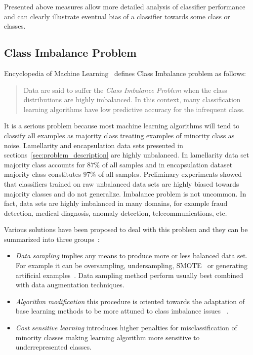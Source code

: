 \documentclass[a4paper, 11pt, table]{article}
\begin{document}
Presented above measures allow more detailed analysis of classifier performance and can clearly illustrate eventual bias of a classifier towards some class or classes. 

\subsection{Class Imbalance Problem}
\label{sec:class_imbalance}
Encyclopedia of Machine Learning~\cite{Ling2010} defines Class Imbalance problem as follows:
\blockquote{Data are said to suffer the \textit{Class Imbalance Problem} when the class distributions are highly imbalanced. In this context, many classification learning algorithms have low predictive accuracy for the infrequent class.}

It is a serious problem because most machine learning algorithms will tend to classify all examples as majority class treating examples of minority class as noise. Lamellarity and encapsulation data sets presented in sections~\ref{sec:problem_description} are highly unbalanced. In lamellarity data set majority class accounts for $87\%$ of all samples and in encapsulation dataset majority class constitutes $97\%$ of all samples. Preliminary experiments showed that classifiers trained on raw unbalanced data sets are highly biased towards majority classes and do not generalize. Imbalance problem is not uncommon. In fact, data sets are highly imbalanced in many domains, for example fraud detection, medical diagnosis, anomaly detection, telecommunications, etc. 

Various solutions have been proposed to deal with this problem and they can be summarized into three groups~\cite{Lopez2013113}:

\begin{itemize}

\item \textit{Data sampling} implies any means to produce more or less balanced data set. For example it can be oversampling, undersampling, SMOTE~\cite{smote_chawla} or generating artificial examples~\cite{ishaq_synthetic}. Data sampling method perform usually best combined with data augmentation techniques.

\item \textit{Algorithm modification} this procedure is oriented towards the adaptation of base learning methods to be more attuned to class imbalance issues ~\cite{Zadrozny:2001:LMD:502512.502540}.

\item \textit{Cost sensitive learning} introduces higher penalties for misclassification of minority classes making learning algorithm more sensitive to underrepresented classes. 

\end{itemize}
\end{document}

